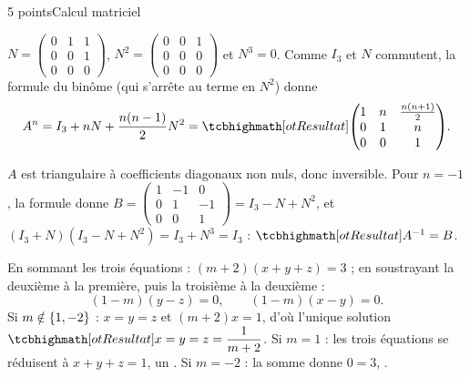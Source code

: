\begin{corrigeEval}{5 points}{Calcul matriciel}
\begin{questions}
  \item $N=\begin{pmatrix}0&1&1\\0&0&1\\0&0&0\end{pmatrix}$,
    $N^{2}=\begin{pmatrix}0&0&1\\0&0&0\\0&0&0\end{pmatrix}$ et $N^{3}=0$.
    Comme $I_3$ et $N$ commutent, la formule du binôme (qui s'arrête au
    terme en $N^{2}$) donne
    \[A^{n}=I_3+nN+\frac{n(n-1)}{2}N^{2}
      =\res{\begin{pmatrix}1&n&\frac{n(n+1)}2\\0&1&n\\0&0&1\end{pmatrix}}.\]
  \item $A$ est triangulaire à coefficients diagonaux non nuls, donc
    inversible. Pour $n=-1$, la formule donne
    $B=\begin{pmatrix}1&-1&0\\0&1&-1\\0&0&1\end{pmatrix}=I_3-N+N^{2}$, et
    $(I_3+N)(I_3-N+N^{2})=I_3+N^{3}=I_3$ : $\res{A^{-1}=B}$. \pts{1 pt}
  \item En sommant les trois équations : $(m+2)(x+y+z)=3$ ; en soustrayant
    la deuxième à la première, puis la troisième à la deuxième :
    \[(1-m)(y-z)=0,\qquad(1-m)(x-y)=0.\]
    Si $m\notin\left\{1,-2\right\}$ : $x=y=z$ et $(m+2)x=1$, d'où l'unique solution
    $\res{x=y=z=\dfrac{1}{m+2}}$. Si $m=1$ : les trois équations se
    réduisent à $x+y+z=1$, un . Si $m=-2$ :
    la somme donne $0=3$, . 
\end{questions}
\end{corrigeEval}

